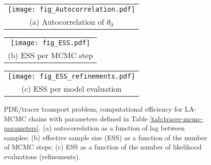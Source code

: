\begin{figure}
  \centering

  \begin{tabular}{@{}c@{}}
    \texttt{[image: fig\_Autocorrelation.pdf]} \\[\abovecaptionskip]
    \small (a) Autocorrelation of $\theta_0$
  \end{tabular}
  
  \begin{tabular}{@{}c@{}}
    \texttt{[image: fig\_ESS.pdf]} \\[\abovecaptionskip]
    \small (b) ESS per MCMC step 
  \end{tabular}
  
  \begin{tabular}{@{}c@{}}
    \texttt{[image: fig\_ESS\_refinements.pdf]} \\[\abovecaptionskip]
    \small (c) ESS per model evaluation
  \end{tabular}
  
  \caption{PDE/tracer transport problem, computational efficiency for LA-MCMC chains with parameters defined in Table \ref{tab:tracer-mcmc-parameters}. (a) autocorrelation as a function of lag between samples; (b) effective sample size (ESS) as a function of the number of MCMC steps; (c) ESS as a function of the number of likelihood evaluations (refinements).}
  \label{fig:tracer-autocorrelation-ess}
\end{figure}


